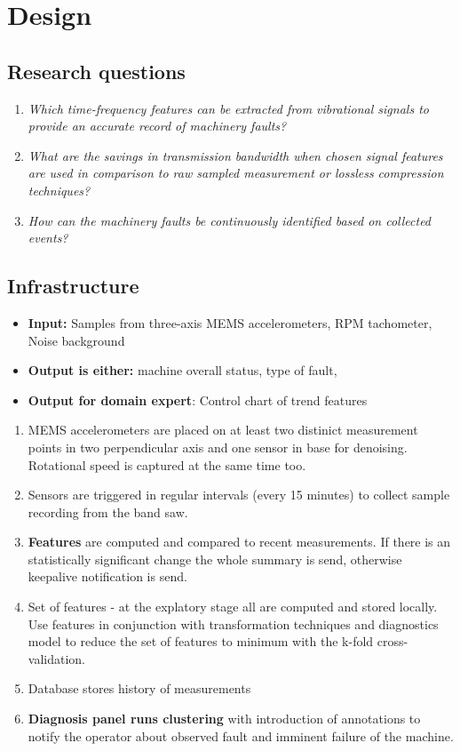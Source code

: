 \chapter{Design}

\section{Research questions}
\begin{enumerate}
\item \emph{Which time-frequency features can be extracted from vibrational signals to provide an accurate record of machinery faults?}
\item \emph{What are the savings in transmission bandwidth when chosen signal features are used in comparison to raw sampled measurement or lossless compression techniques?}
\item \emph{How can the machinery faults be continuously identified based on collected events?}
\end{enumerate}

\section{Infrastructure}
 \begin{itemize}
\item \textbf{Input:} Samples from three-axis MEMS accelerometers, RPM tachometer, Noise background
\item \textbf{Output is either:} machine overall status, type of fault,
\item \textbf{Output for domain expert}: Control chart of trend features
\end{itemize}

\begin{enumerate}
\item MEMS accelerometers are placed on at least two distinict measurement points in two perpendicular axis and one sensor in base for denoising. Rotational speed is captured at the same time too.
\item Sensors are triggered in regular intervals (every 15 minutes) to collect sample recording from the band saw.
\item \textbf{Features} are computed and compared to recent measurements. If there is an statistically significant change the whole summary is send, otherwise keepalive notification is send.
\item Set of features - at the explatory stage all are computed and stored locally. Use features in conjunction with transformation techniques and diagnostics model to reduce the set of features to minimum with the k-fold cross-validation.
\item Database stores history of measurements
\item \textbf{Diagnosis panel runs clustering} with introduction of annotations to notify the operator about observed fault and imminent failure of the machine.
\end{enumerate}


